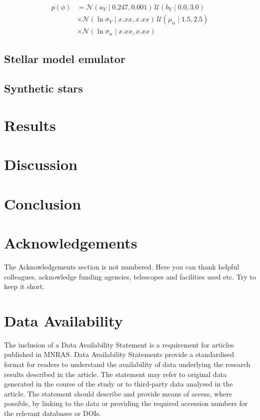 \documentclass[fleqn,usenatbib]{mnras}
\newcommand{\normal}{\mathcal{N}}
\newcommand{\uniform}{\mathcal{U}}
\begin{document}
\begin{equation}
    \begin{split}
        p(\phi) &= \normal(a_Y \mid 0.247, 0.001) \, \uniform(b_Y \mid 0.0, 3.0) \\
        &\times \normal(\ln \sigma_Y \mid x.xx, x.xx) \, \uniform(\mu_\alpha \mid 1.5, 2.5) \\
        &\times \normal(\ln \sigma_\alpha \mid x.xx, x.xx)
    \end{split}
\end{equation}

\subsection{Stellar model emulator}
\label{sec:emulator}

\subsection{Synthetic stars}
\label{sec:synth}

\section{Results}
\label{sec:results}

\section{Discussion}
\label{sec:discussion}

\section{Conclusion}
\label{sec:conclusion}

\section*{Acknowledgements}

The Acknowledgements section is not numbered. Here you can thank helpful
colleagues, acknowledge funding agencies, telescopes and facilities used etc.
Try to keep it short.

\section*{Data Availability}
 
The inclusion of a Data Availability Statement is a requirement for articles published in MNRAS. Data Availability Statements provide a standardised format for readers to understand the availability of data underlying the research results described in the article. The statement may refer to original data generated in the course of the study or to third-party data analysed in the article. The statement should describe and provide means of access, where possible, by linking to the data or providing the required accession numbers for the relevant databases or DOIs.
\end{document}

